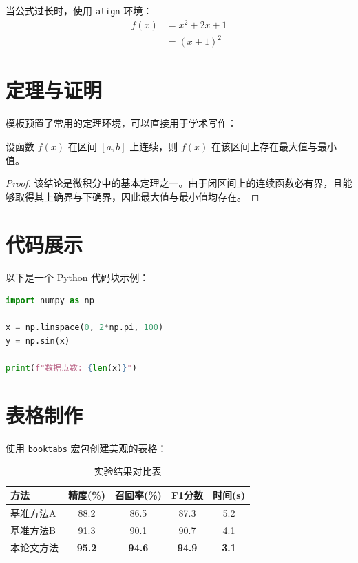 当公式过长时，使用 \texttt{align} 环境：
\begin{align}
    f(x) &= x^2 + 2x + 1 \\
    &= (x+1)^2
    \label{eq:expansion}
\end{align}

\section{定理与证明}

模板预置了常用的定理环境，可以直接用于学术写作：

\begin{theorem}
设函数 $f(x)$ 在区间 $[a,b]$ 上连续，则 $f(x)$ 在该区间上存在最大值与最小值。
\end{theorem}

\begin{proof}
该结论是微积分中的基本定理之一。由于闭区间上的连续函数必有界，且能够取得其上确界与下确界，因此最大值与最小值均存在。
\end{proof}

\section{代码展示}

以下是一个 Python 代码块示例：

\begin{lstlisting}[language=Python, caption={Python 代码示例}, label=code:python]
import numpy as np

x = np.linspace(0, 2*np.pi, 100)
y = np.sin(x)

print(f"数据点数: {len(x)}")
\end{lstlisting}

\section{表格制作}

使用 \texttt{booktabs} 宏包创建美观的表格：

\begin{table}[htbp]
    \centering
    \caption{实验结果对比表}
    \label{tab:results}
    \begin{tabular}{lcccc}
        \toprule
        方法 & 精度(\%) & 召回率(\%) & F1分数 & 时间(s) \\
        \midrule
        基准方法A & 88.2 & 86.5 & 87.3 & 5.2 \\
        基准方法B & 91.3 & 90.1 & 90.7 & 4.1 \\
        本论文方法 & \textbf{95.2} & \textbf{94.6} & \textbf{94.9} & \textbf{3.1} \\
        \bottomrule
    \end{tabular}
\end{table}


